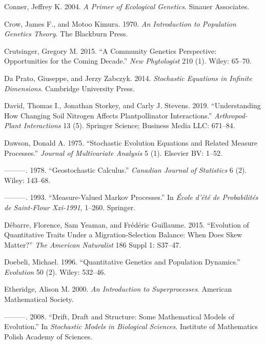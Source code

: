 \documentclass[]{article}
\begin{document}
\leavevmode\hypertarget{ref-jeffreyconner2004}{}%
Conner, Jeffrey K. 2004. \emph{A Primer of Ecological Genetics}. Sinauer
Associates.

\leavevmode\hypertarget{ref-9781932846126}{}%
Crow, James F., and Motoo Kimura. 1970. \emph{An Introduction to
Population Genetics Theory}. The Blackburn Press.

\leavevmode\hypertarget{ref-Crutsinger2015}{}%
Crutsinger, Gregory M. 2015. ``A Community Genetics Perspective:
Opportunities for the Coming Decade.'' \emph{New Phytologist} 210 (1).
Wiley: 65--70.

\leavevmode\hypertarget{ref-DaPrato2014}{}%
Da Prato, Giuseppe, and Jerzy Zabczyk. 2014. \emph{Stochastic Equations
in Infinite Dimensions}. Cambridge University Press.

\leavevmode\hypertarget{ref-David2019}{}%
David, Thomas I., Jonathan Storkey, and Carly J. Stevens. 2019.
``Understanding How Changing Soil Nitrogen Affects Plantpollinator
Interactions.'' \emph{Arthropod-Plant Interactions} 13 (5). Springer
Science; Business Media LLC: 671--84.

\leavevmode\hypertarget{ref-Dawson1975}{}%
Dawson, Donald A. 1975. ``Stochastic Evolution Equations and Related
Measure Processes.'' \emph{Journal of Multivariate Analysis} 5 (1).
Elsevier BV: 1--52.

\leavevmode\hypertarget{ref-Dawson1978}{}%
---------. 1978. ``Geostochastic Calculus.'' \emph{Canadian Journal of
Statistics} 6 (2). Wiley: 143--68.

\leavevmode\hypertarget{ref-dawson1993measure}{}%
---------. 1993. ``Measure-Valued Markov Processes.'' In \emph{École
d'été de Probabilités de Saint-Flour Xxi-1991}, 1--260. Springer.

\leavevmode\hypertarget{ref-Dbarre2015EvolutionOQ}{}%
Débarre, Florence, Sam Yeaman, and Frédéric Guillaume. 2015. ``Evolution
of Quantitative Traits Under a Migration-Selection Balance: When Does
Skew Matter?'' \emph{The American Naturalist} 186 Suppl 1: S37--47.

\leavevmode\hypertarget{ref-Doebeli1996}{}%
Doebeli, Michael. 1996. ``Quantitative Genetics and Population
Dynamics.'' \emph{Evolution} 50 (2). Wiley: 532--46.

\leavevmode\hypertarget{ref-alisonetheridge2000}{}%
Etheridge, Alison M. 2000. \emph{An Introduction to Superprocesses}.
American Mathematical Society.

\leavevmode\hypertarget{ref-Etheridge2008}{}%
---------. 2008. ``Drift, Draft and Structure: Some Mathematical Models
of Evolution.'' In \emph{Stochastic Models in Biological Sciences}.
Institute of Mathematics Polish Academy of Sciences.
\end{document}
